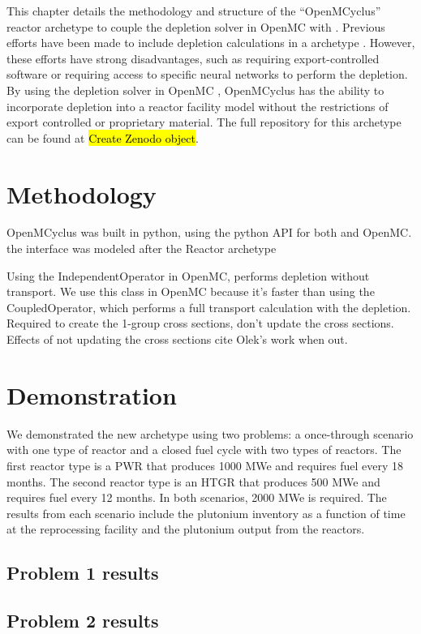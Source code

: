 This chapter details the methodology and structure of the ``OpenMCyclus'' 
reactor archetype to couple the depletion solver in OpenMC 
\cite{romano_depletion_2021} with 
\Cyclus. Previous efforts have been made to include depletion calculations 
in a \Cyclus archetype \cite{skutnik_cyborg_2016,bae_deep_2020}. However, these efforts 
have strong disadvantages, such as requiring export-controlled software 
or requiring access to specific neural networks to perform the depletion. 
By using the depletion solver in OpenMC \cite{romano_depletion_2021}, OpenMCyclus 
has the ability to incorporate depletion into a reactor facility model without 
the restrictions of export controlled or proprietary material. The full 
repository for this archetype can be found at \hl{Create Zenodo object}.

\section{Methodology}
OpenMCyclus was built in python, using the python API for both \Cyclus 
and OpenMC. the \Cyclus interface was modeled after the \Cycamore Reactor archetype




Using the IndependentOperator in OpenMC, performs depletion without transport. 
We use this class in 
OpenMC because it's faster than using the CoupledOperator, which performs a full 
transport calculation with the depletion. Required to create the 1-group cross 
sections, don't update the cross sections. Effects of not updating the cross 
sections cite Olek's work when out. 

\section{Demonstration}
We demonstrated the new archetype using two problems: a once-through scenario with one 
type of reactor and a closed fuel cycle with two types of reactors. The first 
reactor type is a \gls{PWR} that produces 1000 MWe and requires fuel every 
18 months. The second reactor type is an \gls{HTGR} that produces 500 MWe and requires 
fuel every 12 months. In both scenarios, 2000 MWe is required. The results from each 
scenario include the plutonium inventory as a function of time at the reprocessing 
facility and the plutonium output from the reactors. 

\subsection{Problem 1 results}

\subsection{Problem 2 results}